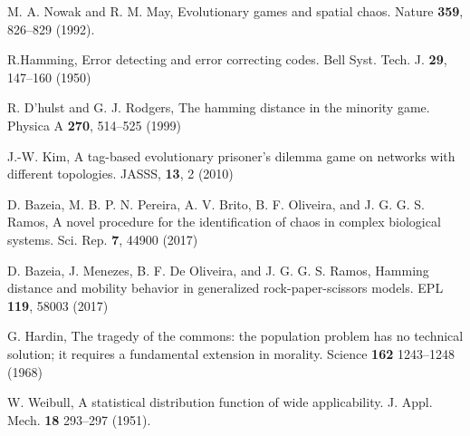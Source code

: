 \begin{thebibliography}{04}

M. A. Nowak and R. M. May,
Evolutionary games and spatial chaos. 
Nature \textbf{359}, 826--829 (1992).

\raggedright
R.Hamming,
Error detecting and error correcting codes.
Bell Syst. Tech. J. \textbf{29}, 147--160 
(1950)


\raggedright
R. D'hulst and G. J. Rodgers,
The hamming distance in the minority game.
Physica A \textbf{270}, 514--525 (1999) 


\raggedright
J.-W. Kim,
A tag-based evolutionary prisoner's dilemma game on networks with different topologies.
JASSS, \textbf{13}, 2 (2010)


\raggedright
D. Bazeia, M. B. P. N. Pereira, A. V. Brito, B. F. Oliveira, and J. G. G. S. Ramos,
A novel procedure for the identification of chaos in complex biological systems.
Sci. Rep. \textbf{7}, 44900 (2017)

\raggedright
D. Bazeia, J. Menezes, B. F. De Oliveira, and J. G. G. S. Ramos,
Hamming distance and mobility behavior in generalized rock-paper-scissors models.
EPL \textbf{119}, 58003 (2017)


\raggedright
G. Hardin,
The tragedy of the commons: the population problem has no technical solution; it requires a fundamental extension in morality.
Science \textbf{162} 1243--1248 (1968)



\raggedright
W. Weibull, A statistical distribution function of wide applicability.
J. Appl. Mech. \textbf{18} 293--297 (1951).


\end{thebibliography}
